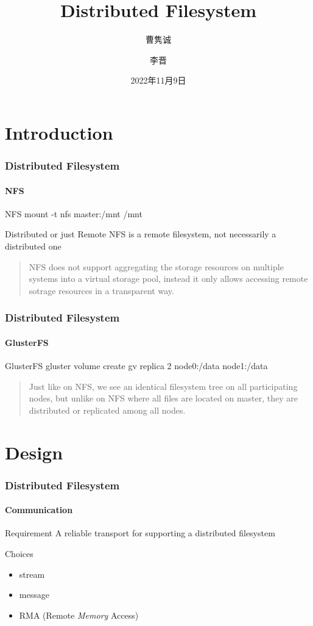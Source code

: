 \documentclass{ctexbeamer}
\title{Distributed Filesystem}
\author{曹隽诚 \and 李晋}
\date{2022年11月9日}
\begin{document}
\frame{\titlepage}

\section{Introduction}

\begin{frame}
\frametitle{Distributed Filesystem}
\framesubtitle{NFS}
\begin{exampleblock}{NFS}
  mount -t nfs master:/mnt /mnt
\end{exampleblock}
\begin{alertblock}{Distributed or just Remote}
  NFS is a remote filesystem, not necessarily a distributed one
\end{alertblock}
\begin{quotation}
  NFS does not support aggregating the storage resources on multiple systems into a virtual storage pool, instead it only allows accessing remote sotrage resources in a transparent way.
\end{quotation}
\end{frame}

\begin{frame}
\frametitle{Distributed Filesystem}
\framesubtitle{GlusterFS}
\begin{exampleblock}{GlusterFS}
  gluster volume create gv replica 2 node0:/data node1:/data
\end{exampleblock}
\begin{quotation}
  Just like on NFS, we see an identical filesystem tree on all participating nodes, but unlike on NFS where all files are located on master, they are distributed or replicated among all nodes.
\end{quotation}
\end{frame}

\section{Design}
\begin{frame}
\frametitle{Distributed Filesystem}
\framesubtitle{Communication}
\begin{block}{Requirement}
  A reliable transport for supporting a distributed filesystem
\end{block}
\begin{exampleblock}{Choices}
  \begin{itemize}
    \item stream
    \item message
    \item RMA (Remote \emph{Memory} Access)
  \end{itemize}
\end{exampleblock}
\end{frame}
\end{document}

